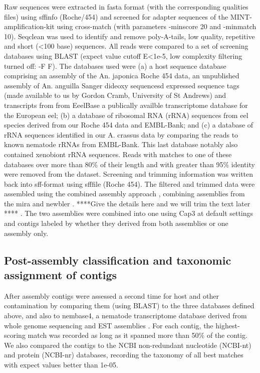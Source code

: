 Raw sequences were extracted in fasta format (with the corresponding
qualities files) using sffinfo (Roche/454) and screened for adapter
sequences of the MINT-amplification-kit using cross-match \cite{PHRAP}
(with parameters -minscore 20 and -minmatch 10). Seqclean
\cite{tgicl_pertea} was used to identify and remove poly-A-tails, low
quality, repetitive and short (<100 base) sequences. All reads were
compared to a set of screening databases using BLAST (expect value
cutoff E<1e-5, low complexity filtering turned off: -F F). The
databases used were (a) a host sequence database comprising an
assembly of the An. japonica Roche 454 data, an unpublished assembly
of An. anguilla Sanger dideoxy sequencesd expressed sequence tags
(made available to us by Gordon Cramb, University of St Andrews) and
transcripts from from EeelBase \cite{pmid21080939} a publically
availble transcriptome database for the European eel; (b) a database
of ribosomal RNA (rRNA) sequences from eel species derived from our
Roche 454 data and EMBL-Bank; and (c) a database of rRNA sequences
identified in our A. crassus data by comparing the reads to known
nematode rRNAs from EMBL-Bank. This last database notably also
contained xenobiont rRNA sequences. Reads with matches to one of these
databases over more than 80\% of their length and with greater than
95\% identity were removed from the dataset. Screening and trimming
information was written back into sff-format using sfffile (Roche
454). The filtered and trimmed data were assembled using the combined
assembly approach \cite{pmid20950480}, combining assemblies from the
mira \cite{miraEST} and newbler \cite{pmid16056220}. ****Give the
details here and we will trim the text later **** . The two assemblies
were combined into one using Cap3 \cite{Cap3_Huang} at default
settings and contigs labeled by whether they derived from both
assemblies or one assembly only.

\subsection*{Post-assembly classification and taxonomic assignment of
  contigs}

After assembly contigs were assessed a second time for host and other
contamination by comparing them (using BLAST) to the three databases
defined above, and also to nembase4, a nematode transcriptome database
derived from whole genome sequencing and EST assemblies
\cite{parkinson_nembase:resource_2004, pmid21550347}. For each contig,
the highest-scoring match was recorded as long as it spanned more than
50\% of the contig. We also compared the contigs to the NCBI
non-redundant nucleotide (NCBI-nt) and protein (NCBI-nr) databases,
recording the taxonomy of all best matches with expect values better
than 1e-05.


